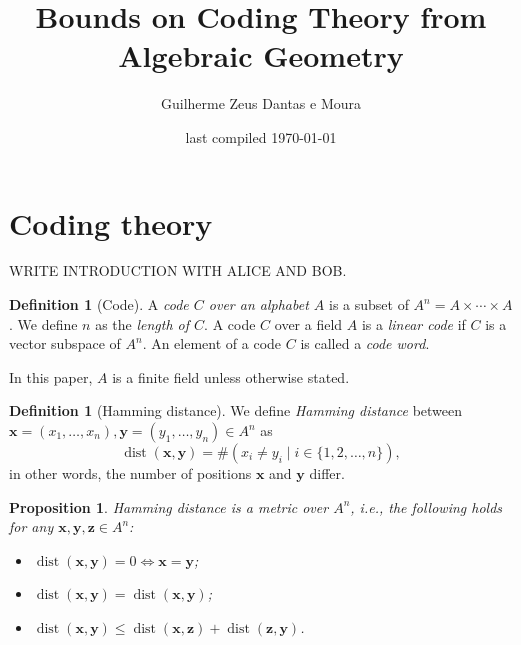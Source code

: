 \documentclass[11pt]{amsart}
\title[Codes from Algebraic Geometry]{Bounds on Coding Theory from Algebraic Geometry}
\author{Guilherme Zeus Dantas e Moura}
\date{last compiled \today} %
\newtheorem{prop}[thm]{Proposition}
\theoremstyle{definition}
\newtheorem{defn}[thm]{Definition}
\theoremstyle{example}
\theoremstyle{remark}
\numberwithin{equation}{section}
\DeclareMathOperator{\dist}{dist}
\begin{document}
%    

\maketitle

\section{Coding theory} \label{s:codingtheory}

WRITE INTRODUCTION WITH ALICE AND BOB.

\begin{defn}[Code]
    A \emph{code $C$ over an alphabet $A$} is a subset of $A^n = A \times \cdots \times A$.
    We define $n$ as the \emph{length of $C$}.
    A code $C$ over a field $A$ is a \emph{linear code} if $C$ is a vector subspace of $A^n$. An element of a code $C$ is called a \emph{code word}.
\end{defn}

In this paper, $A$ is a finite field unless otherwise stated.

\begin{defn}[Hamming distance]
    We define \emph{Hamming distance} between $\mathbf{x} = (x_1, \dots, x_n), \mathbf{y} = (y_1, \dots, y_n) \in A^n$ as
    \begin{equation}
		\dist(\mathbf{x}, \mathbf{y}) = \#\left( x_i \neq y_i \mid i \in \{1, 2, \dots, n\} \right),
	\end{equation}
    in other words, the number of positions $\mathbf{x}$ and $\mathbf{y}$ differ.
\end{defn}

\begin{prop}
    Hamming distance is a metric over $A^n$, i.e., the following holds for any $\mathbf{x}, \mathbf{y}, \mathbf{z} \in A^n$:
    \begin{itemize}[noitemsep]
        \item $\dist(\mathbf{x}, \mathbf{y}) = 0 \iff \mathbf{x} = \mathbf{y}$;
        \item $\dist(\mathbf{x}, \mathbf{y}) = \dist(\mathbf{x}, \mathbf{y})$;
        \item $\dist(\mathbf{x}, \mathbf{y}) \le \dist(\mathbf{x}, \mathbf{z}) + \dist(\mathbf{z}, \mathbf{y})$.
    \end{itemize}
\end{prop}
\end{document}
